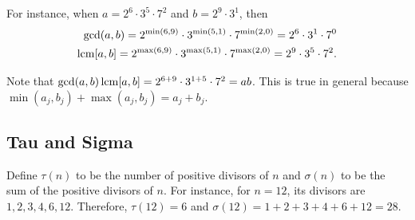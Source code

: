 For instance, when $a=2^6\cdot 3^5\cdot 7^2$ and $b=2^9\cdot 3^1$, then \begin{eqnarray*} \gcd(a,b)=2^{\min(6,9)}\cdot 3^{\min(5,1)}\cdot 7^{\min(2,0)}=2^6\cdot 3^1\cdot 7^0 \\ \operatorname{lcm}[a,b]=2^{\max(6,9)}\cdot 3^{\max(5,1)}\cdot 7^{\max(2,0)}=2^9\cdot 3^5\cdot 7^2. \end{eqnarray*}

Note that $\gcd(a,b)\operatorname{lcm}[a,b]=2^{6+9}\cdot 3^{1+5}\cdot 7^2=ab$. This is true in general because $\min(a_j, b_j)+\max(a_j, b_j)=a_j+b_j$. 

\clearpage

\subsection{Tau and Sigma}

\begin{defi} Define $\tau(n)$ to be the number of positive divisors of $n$ and $\sigma(n)$ to be the sum of the positive divisors of $n$. For instance, for $n=12$, its divisors are $1, 2, 3, 4, 6, 12$. Therefore, $\tau(12)=6$ and $\sigma(12)=1+2+3+4+6+12=28$. \end{defi}


\clearpage

